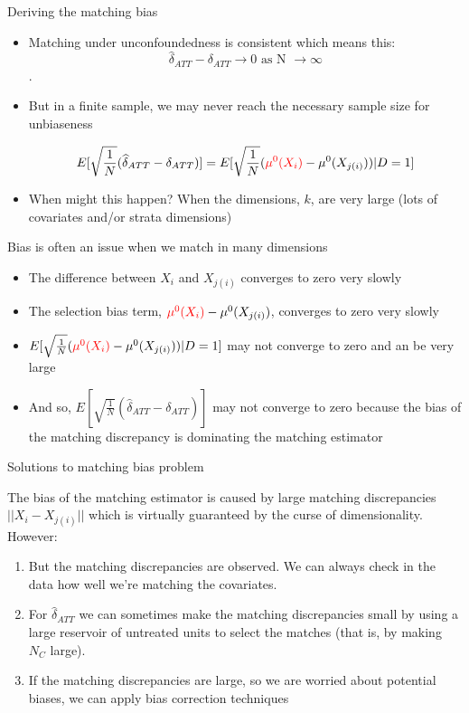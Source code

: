 \documentclass{beamer}
\begin{document}
\begin{frame}{Deriving the matching bias}
	
\begin{itemize}
\item Matching under unconfoundedness is consistent which means this:
$$\widehat{\delta}_{ATT} - \delta_{ATT} \to 0\text{ as N }\to \infty $$.
 \item But in a finite sample, we may never reach the necessary sample size for unbiaseness

$$E[ \sqrt{\frac{1}{N}} (\widehat{\delta}_{ATT} - \delta_{ATT})] = E[ \sqrt{\frac{1}{N}} ( \textcolor{red}{\mu^0(X_i)} - \mu^0(X_{j(i)}) ) | D=1]$$ 

\item When might this happen?  When the dimensions, $k$, are very large (lots of covariates and/or strata dimensions)

\end{itemize}
\end{frame}

\begin{frame}{ Bias is often an issue when we match in many dimensions}

	\begin{itemize}
	\item The difference between $X_i$ and $X_{j(i)}$ converges to zero very slowly 
	\item The selection bias term, $\textcolor{red}{\mu^0(X_i)} - \mu^0(X_{j(i)})$, converges to zero very slowly 
	\item $E[ \sqrt{\frac{1}{N}} (\textcolor{red}{\mu^0(X_i)} - \mu^0(X_{j(i)})) | D=1]$ may not converge to zero and an be very large
	\item And so, $E[ \sqrt{\frac{1}{N}} (\widehat{\delta}_{ATT} - \delta_{ATT})]$ may not converge to zero because the bias of the matching discrepancy is dominating the matching estimator
	\end{itemize}

\end{frame}

\begin{frame}{Solutions to matching bias problem}
	
The bias of the matching estimator is caused by large matching discrepancies $||X_i - X_{j(i)}||$ which is virtually guaranteed by the curse of dimensionality.  However:
	\begin{enumerate}
	\item But the matching discrepancies are observed. We can always check in the data how well we're matching the covariates.

	\item For $\widehat{\delta}_{ATT}$ we can sometimes make the matching discrepancies small by using a large reservoir of untreated units to select the matches (that is, by making $N_C$ large).

  \item If the matching discrepancies are large, so we are worried about potential biases, we can apply bias correction techniques

	\end{enumerate}
\end{frame}
\end{document}
